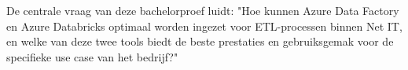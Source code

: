 

\section{}%
\label{sec:onderzoeksvraag}

De centrale vraag van deze bachelorproef luidt: "Hoe kunnen Azure Data Factory en Azure Databricks optimaal worden ingezet voor ETL-processen binnen Net IT, en welke van deze twee tools biedt de beste prestaties en gebruiksgemak voor de specifieke use case van het bedrijf?"


\section{}%
\label{sec:onderzoeksdoelstelling}

